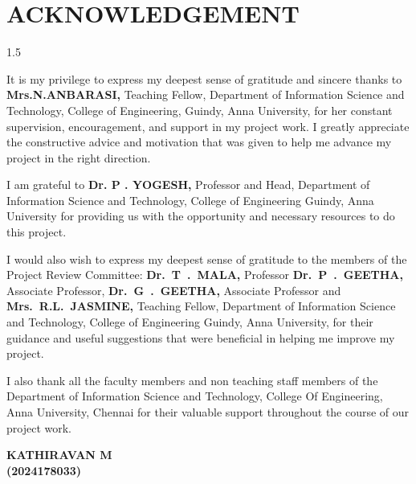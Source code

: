 \chapter*{\uppercase{ACKNOWLEDGEMENT}}
\begin{spacing}{1.5}
\begin{sloppypar}
It is my privilege to express my deepest sense of gratitude and sincere
thanks to {\textbf{Mrs.N.ANBARASI,}} Teaching Fellow, Department of Information Science and Technology, College of Engineering, Guindy, Anna University, for her constant supervision, encouragement, and support in my project work. I greatly appreciate the constructive advice and motivation that was given to help me advance my project in the right direction.

I am grateful to {\textbf{Dr. P . YOGESH,}} Professor and Head, Department
of Information Science and Technology, College of Engineering Guindy, Anna University for providing us with the opportunity and necessary resources to do this project.
\begin{sloppypar}
I would also wish to express my deepest sense of gratitude to the members of the Project Review Committee: {\textbf{\mbox{Dr. T . MALA,}}} Professor {\textbf{\mbox{Dr. P . GEETHA,}}} Associate Professor, {\textbf{\mbox{Dr. G . GEETHA,}}} Associate Professor  and {\textbf{\mbox{Mrs. R.L. JASMINE,}}} Teaching Fellow, Department of Information Science and Technology, College of Engineering Guindy, Anna University, for their guidance and useful suggestions that were beneficial in helping me improve my project.
\end{sloppypar}
I also thank all the faculty members and non teaching staff members of the Department of Information Science and Technology, College Of Engineering, Anna University, Chennai for their valuable support throughout the course of our project work.
\end{sloppypar}
\begin{flushright}
 {\textbf{KATHIRAVAN M}}\\
 {\textbf{(2024178033)}} 
\end{flushright}
\end{spacing}